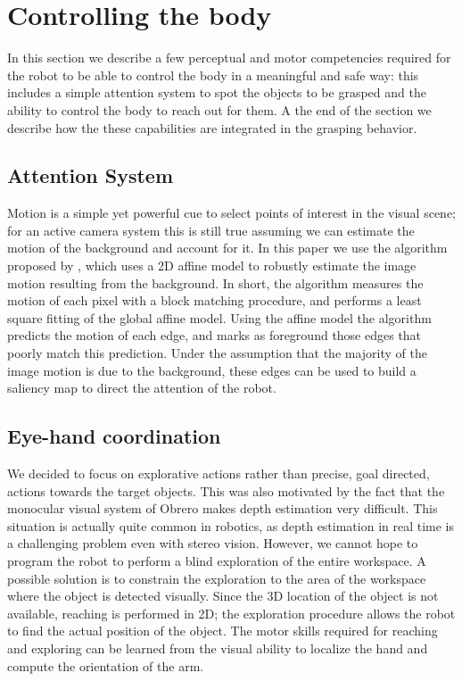 \section{Controlling the body}
\label{sec:controlling}
%
In this section we describe a few perceptual and motor competencies required
for the robot to be able to control the body in a meaningful and safe way:
this includes a simple attention system to spot the objects to be grasped
and the ability to control the body to reach out for them. A the end of the
section we describe how the these capabilities are integrated in the grasping
behavior.
%
\subsection{Attention System}
Motion is a simple yet powerful cue to select points of interest
in the visual scene; for an active camera system this is still
true assuming we can estimate the motion of the background and
account for it. In this paper we use the algorithm proposed by
\cite{kemp-thesis}, which uses a 2D affine model to robustly
estimate the image motion resulting from the background. In short,
the algorithm measures the motion of each pixel with a block
matching procedure, and performs a least square fitting of the
global affine model. Using the affine model the algorithm predicts
the motion of each edge, and marks as foreground
those edges that poorly match this prediction. Under the
assumption that the majority of the image motion is due to the
background, these edges can be used to build a saliency map to
direct the attention of the robot.
%
\subsection{Eye-hand coordination}
We decided to focus on explorative
actions rather than precise, goal directed, actions towards the target objects.
This was also motivated by the fact that the monocular visual system of Obrero
makes depth estimation very difficult. This situation is actually quite common
in robotics, as depth estimation in real time is a challenging problem even 
with stereo vision.
However, we cannot hope to program the robot to perform
a blind exploration of the entire workspace. A possible solution is to
constrain the exploration to the area of the workspace where the object is
detected visually. Since the 3D location of the object is not available, 
reaching is performed in 2D; the exploration procedure allows the 
robot to find the actual position of the object. The motor skills 
required for reaching and exploring can be learned from the 
visual ability to localize the hand and compute the 
orientation of the arm.
%

